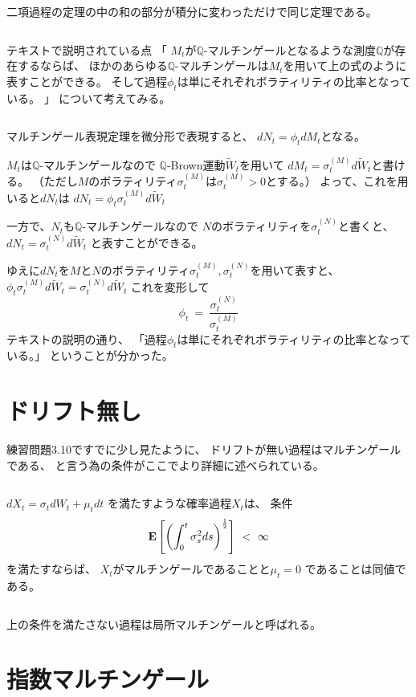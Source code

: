 \documentclass[uplatex,a4j,12pt,dvipdfmx]{jsarticle}
\begin{document}
二項過程の定理の中の和の部分が積分に変わっただけで同じ定理である。

${}$

テキストで説明されている点
「
$M_{t}$が$\mathbb{Q}$-マルチンゲールとなるような測度$\mathbb{Q}$が存在するならば、
ほかのあらゆる$\mathbb{Q}$-マルチンゲールは$M_{t}$を用いて上の式のように表すことができる。
そして過程$\phi_{t}$は単にそれぞれボラティリティの比率となっている。
」
について考えてみる。

${}$

マルチンゲール表現定理を微分形で表現すると、
$d N_{t} = \phi_{t} dM_{t}$となる。

$M_{t}$は$\mathbb{Q}$-マルチンゲールなので
$\mathbb{Q}$-Brown運動$\tilde{W}_{t}$を用いて
$d M_{t} = \sigma^{(M)}_{t} d \tilde{W}_{t}$と書ける。
（ただし$M$のボラティリティ$\sigma^{(M)}_{t}$は$\sigma^{(M)}_{t}>0$とする。）
よって、これを用いると$dN_{t}$は
$dN_{t} = \phi_{t} \sigma^{(M)}_{t} d \tilde{W}_{t}$

一方で、$N_{t}$も$\mathbb{Q}$-マルチンゲールなので
$N$のボラティリティを$\sigma^{(N)}_{t}$と書くと、
$dN_{t} = \sigma_{t}^{(N)} d \tilde{W}_{t}$
と表すことができる。

ゆえに$dN_{t}$を$M$と$N$のボラティリティ$\sigma^{(M)}_{t},\sigma^{(N)}_{t}$を用いて表すと、
$
	\phi_{t} \sigma^{(M)}_{t} d \tilde{W}_{t}
	=
	\sigma_{t}^{(N)} d \tilde{W}_{t}
$
これを変形して
$$
	\phi_{t}
	\ = \
	\dfrac{\sigma_{t}^{(N)}}{\sigma^{(M)}_{t}}
$$
テキストの説明の通り、
「過程$\phi_{t}$は単にそれぞれボラティリティの比率となっている。」
ということが分かった。

\section{ドリフト無し}

練習問題3.10ですでに少し見たように、
ドリフトが無い過程はマルチンゲールである、
と言う為の条件がここでより詳細に述べられている。

${}$

$dX_{t}= \sigma_{t} dW_{t} + \mu_{t} dt$
を満たすような確率過程$X_{t}$は、
条件
$$
	{\bf E}
	\left[
		\left(
		\int^{t}_{0} \sigma_{s}^{2} ds
		\right)^{\frac{1}{2}}
		\right]
	\ < \
	\infty
$$
を満たすならば、
$X_{t}$がマルチンゲールであることと$\mu_{t} = 0$
であることは同値である。

${}$

上の条件を満たさない過程は局所マルチンゲールと呼ばれる。

\section{指数マルチンゲール}
\end{document}
